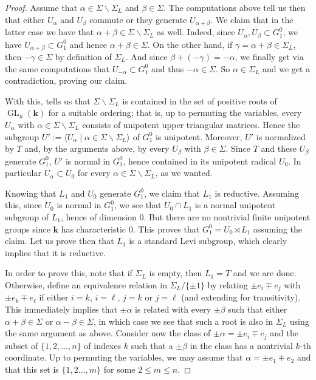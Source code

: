 \documentclass[11pt,letterpaper,reqno]{amsart}
\theoremstyle{remark}
\theoremstyle{definition}
\newcommand{\KK}[0]{\ensuremath{\mathbf{k}}}
\newcommand{\GL}[0]{\ensuremath{\operatorname{GL}}}
\begin{document}
\begin{proof}
Assume that $\alpha\in \Sigma\smallsetminus \Sigma_L$ and $\beta\in\Sigma$. The computations above tell us then that either $U_\alpha$ and $U_\beta$ commute or they generate $U_{\alpha+\beta}$. We claim that in the latter case we have that $\alpha+\beta\in \Sigma\smallsetminus \Sigma_L$ as well. Indeed, since $U_\alpha,U_\beta\subset G_1^0$, we have $U_{\alpha+\beta}\subset G_1^0$ and hence $\alpha+\beta\in \Sigma$. On the other hand, if $\gamma=\alpha+\beta\in \Sigma_L$, then $-\gamma\in \Sigma$ by definition of $\Sigma_L$. And since $\beta+(-\gamma)=-\alpha$, we finally get via the same computations that $U_{-\alpha}\subset G_1^0$ and thus $-\alpha\in \Sigma$. So $\alpha\in \Sigma_L$ and we get a contradiction, proving our claim.

With this, \cite[Ch.~VI, \S1.7, Prop.~22]{BourbakiLie46} tells us that $\Sigma\smallsetminus \Sigma_L$ is contained in the set of positive roots of $\GL_n(\KK)$ for a suitable ordering; that is, up to permuting the variables, every $U_\alpha$ with $\alpha\in\Sigma\smallsetminus \Sigma_L$ consists of unipotent upper triangular matrices. Hence the subgroup $U':=\langle U_\alpha\mid\alpha\in\Sigma\smallsetminus \Sigma_L\rangle$ of $G_1^0$ is unipotent. Moreover, $U'$ is normalized by $T$ and, by the arguments above, by every $U_\beta$ with $\beta\in\Sigma$. Since $T$ and these $U_\beta$ generate $G_1^0$, $U'$ is normal in $G_1^0$, hence contained in its unipotent radical $U_0$. In particular $U_\alpha\subset U_0$ for every $\alpha\in\Sigma\smallsetminus\Sigma_L$, as we wanted.

Knowing that $L_1$ and $U_0$ generate $G_1^0$, we claim that $L_1$ is reductive. Assuming this, since $U_0$ is normal in $G_1^0$, we see that $U_0\cap L_1$ is a normal unipotent subgroup of $L_1$, hence of dimension 0. But there are no nontrivial finite unipotent groups since $\KK$ has characteristic 0. This proves that $G_1^0=U_0\rtimes L_1$ assuming the claim. Let us prove then that $L_1$ is a standard Levi subgroup, which clearly implies that it is reductive.

In order to prove this, note that if $\Sigma_L$ is empty, then $L_1=T$ and we are done. Otherwise, define an equivalence relation in $\Sigma_L/\{\pm 1\}$ by relating $\pm e_i\mp e_j$ with $\pm e_k \mp e_\ell$ if either $i=k$, $i=\ell$, $j=k$ or $j=\ell$ (and extending for transitivity). This immediately implies that $\pm \alpha$ is related with every $\pm\beta$ such that either $\alpha+\beta\in \Sigma$ or $\alpha-\beta\in \Sigma$, in which case we see that such a root is also in $\Sigma_L$ using the same argument as above. Consider now the class of $\pm\alpha=\pm e_i\mp e_j$ and the subset of $\{1,2,\ldots,n\}$ of indexes $k$ such that a $\pm\beta$ in the class has a nontrivial $k$-th coordinate. Up to permuting the variables, we may assume that $\alpha=\pm e_1 \mp e_2$ and that this set is $\{1,2\ldots,m\}$ for some $2\leq m\leq n$.


\end{proof}
\end{document}

